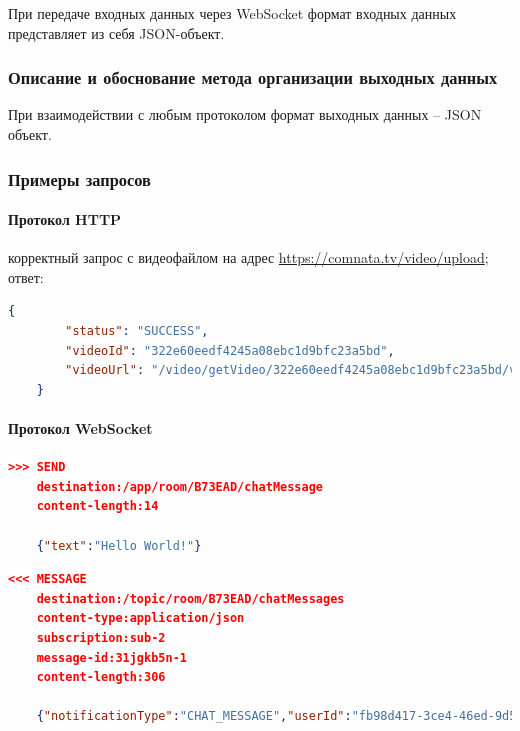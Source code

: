 \documentclass{../includes/TechDoc}
\begin{document}
    При передаче входных данных через WebSocket формат входных данных представляет из себя JSON-объект.

    \subsubsection{Описание и обоснование метода организации выходных данных}

    При взаимодействии с любым протоколом формат выходных данных -- JSON объект.

    \subsubsection{Примеры запросов}

    \paragraph{Протокол HTTP}

     корректный запрос с видеофайлом на адрес \url{https://comnata.tv/video/upload};\\

     ответ:
    \begin{lstlisting}[language=json,caption={Пример ответа при работе с HTTP протоколом}]
    {
  		"status": "SUCCESS",
  		"videoId": "322e60eedf4245a08ebc1d9bfc23a5bd",
  		"videoUrl": "/video/getVideo/322e60eedf4245a08ebc1d9bfc23a5bd/video.m3u8"
	}
    \end{lstlisting}

    \paragraph{Протокол WebSocket}

    \begin{lstlisting}[language=json,caption={Пример запроса при работе с HTTP протоколом}]
    >>> SEND
	destination:/app/room/B73EAD/chatMessage
	content-length:14

	{"text":"Hello World!"}
    \end{lstlisting}

    \begin{lstlisting}[language=json,caption={Пример ответа при работе с WebSocket протоколом}]
    <<< MESSAGE
	destination:/topic/room/B73EAD/chatMessages
	content-type:application/json
	subscription:sub-2
	message-id:31jgkb5n-1
	content-length:306

	{"notificationType":"CHAT_MESSAGE","userId":"fb98d417-3ce4-46ed-9d50-e9c8ebdcdd15","text":"Hello World!","dateTime":{"dayOfWeek":"TUESDAY","dayOfYear":131,"nano":973629000,"year":2021,"monthValue":5,"dayOfMonth":11,"hour":13,"minute":13,"second":18,"month":"MAY","chronology":{"id":"ISO","calendarType":"iso8601"}}}
    \end{lstlisting}
\end{document}
